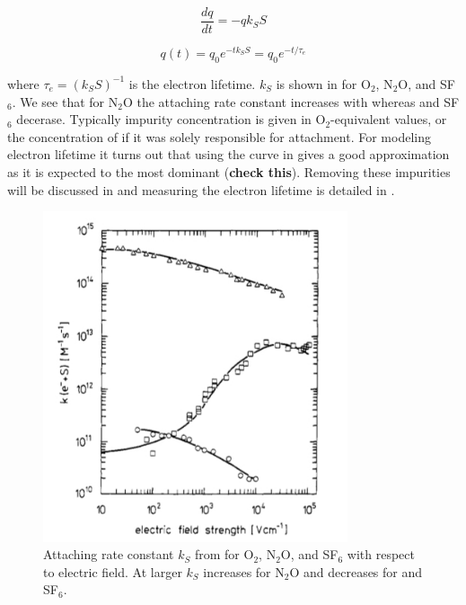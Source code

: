 \begin{equation}
\frac{dq}{dt} = -qk_{S}S
\label{eq:lifetime_diff_eq}
\end{equation}

\begin{equation}
q(t) = q_{0}e^{-tk_{S}S} = q_{0}e^{-t/\tau_{e}}
\label{eq:lifetime_equation}
\end{equation}

\noindent where $\tau_{e} = (k_{S}S)^{-1}$ is the electron lifetime.  $k_{S}$ is shown in  for
O$_{2}$,
N$_{2}$O, and SF$_{6}$.  We see that for N$_{2}$O the attaching rate constant increases with \efield whereas \otwo and SF$_{6}$
decerase.  Typically impurity concentration is given in O$_{2}$-equivalent values, or the concentration of \otwo if it was solely
responsible for \electron attachment.  For modeling electron lifetime it turns out that using the \otwo curve in
 gives a good approximation as it is expected to the most dominant (\textbf{check this}).  Removing these
impurities will be discussed in  and measuring the electron lifetime is detailed in
.

\begin{figure}
\includegraphics[width=0.8\textwidth]{AttachmentRate}
\caption{Attaching rate constant $k_{S}$ from  for O$_{2}$, N$_{2}$O, and SF$_{6}$ with respect to electric field.  At
larger \efields $k_{S}$ increases for N$_{2}$O and decreases for \otwo and SF$_{6}$.}
\label{fig:attachment_rate}
\end{figure}

